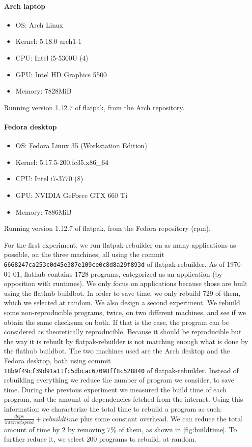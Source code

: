 \documentclass[a4paper,11pt,oneside]{report}
\theoremstyle{definition}
\newcommand{\sysname}{flatpak-rebuilder\xspace}
\newcommand{\fp}{flatpak\xspace}
\newcommand{\fh}{flathub\xspace}
\newcommand{\fhbb}{flathub buildbot\xspace}
\begin{document}
\paragraph{Arch laptop}
\begin{itemize}
    \label{arch-laptop}
    \item OS: Arch Linux
    \item Kernel: 5.18.0-arch1-1
    \item CPU: Intel i5-5300U (4)
    \item GPU: Intel HD Graphics 5500
    \item Memory: 7828MiB
\end{itemize}
Running version 1.12.7 of \fp, from the Arch repository.
\paragraph{Fedora desktop}
\begin{itemize}
    \label{arch-desktop}
    \item OS: Fedora Linux 35 (Workstation Edition)
    \item Kernel: 5.17.5-200.fc35.x86\_64
    \item CPU: Intel i7-3770 (8)
    \item GPU: NVIDIA GeForce GTX 660 Ti
    \item Memory: 7886MiB
\end{itemize}
Running version 1.12.7 of \fp, from the Fedora repository (rpm).

\noindent
For the first experiment, we run \sysname on as many applications as possible,
on the three machines, all using the commit
\verb|6668247ca253c0d45e387e109ce0c8d8a29f893d| of \sysname.
As of \today, \fh contains 1728 programs, categorized as an application (by
opposition with runtimes). We only focus on applications because those are
built using the \fhbb. In order to save time, we only rebuild 729 of them,
which we selected at random.
We also design a second experiment. We rebuild some 
non-reproducible programs, twice, on two different machines, and see if we
obtain the same checksum on both. If that is the case, the program can be
considered as theoretically reproducible. Because it should be reproducible but
the way it is rebuilt by \sysname is not matching enough what is done by the
\fhbb. The two machines used are the Arch desktop and the Fedora desktop, both
using commit \verb|18b9f49cf39d91a11fc5dbcac67098ff8c528840| of \sysname.
Instead of rebuilding everything we reduce the number of program
we consider, to save time.
During the previous experiment we measured the build time of each program, and
the amount of dependencies fetched from the internet. Using this information we
characterize the total time to rebuild a program as such: $\frac{deps}{internet
speed} + rebuild time$ plus some constant overhead. We can reduce the total
amount of time by 2 by removing 7\% of them, as shown in
\autoref{fig:buildtime}. To further reduce it, we select 200 programs to
rebuild, at random.
\end{document}
